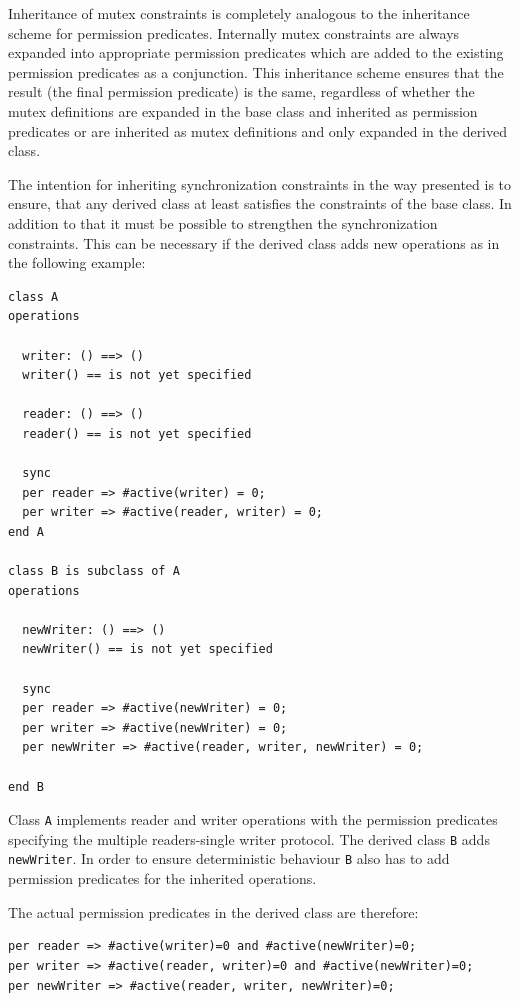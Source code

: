 \documentclass{overturerepchap}
\begin{document}
Inheritance of mutex constraints is completely analogous to the
inheritance scheme for  permission predicates. Internally mutex
constraints are always expanded into appropriate permission predicates
which are added to the existing permission predicates as a
conjunction. This inheritance scheme ensures that the result (the
final permission predicate) is the same, regardless of whether the mutex
definitions are expanded in the base class and inherited as permission
predicates or are inherited as mutex definitions and only expanded in
the derived class.

The intention for inheriting synchronization constraints in the way
presented is to ensure, that any derived class at least
satisfies the constraints of the base class.  In addition to that it
must be possible to strengthen the synchronization constraints. This
can be necessary if the derived class adds new operations as in the
following example:
\begin{lstlisting}
class A 
operations
    
  writer: () ==> () 
  writer() == is not yet specified
    
  reader: () ==> () 
  reader() == is not yet specified
    
  sync
  per reader => #active(writer) = 0; 
  per writer => #active(reader, writer) = 0; 
end A

class B is subclass of A 
operations

  newWriter: () ==> () 
  newWriter() == is not yet specified

  sync
  per reader => #active(newWriter) = 0; 
  per writer => #active(newWriter) = 0; 
  per newWriter => #active(reader, writer, newWriter) = 0; 

end B
\end{lstlisting}

Class \texttt{A} implements reader and writer operations with the permission
predicates specifying the multiple readers-single writer protocol. The
derived class \texttt{B} adds \texttt{newWriter}. In order to ensure
deterministic behaviour \texttt{B} also has to add permission
predicates for the inherited operations.

The actual permission predicates in the derived class
are therefore:
\begin{lstlisting}
per reader => #active(writer)=0 and #active(newWriter)=0; 
per writer => #active(reader, writer)=0 and #active(newWriter)=0;
per newWriter => #active(reader, writer, newWriter)=0;
\end{lstlisting}
\end{document}
